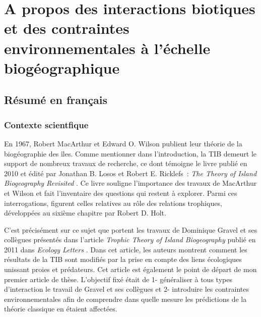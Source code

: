 \chapter{A propos des interactions biotiques et des contraintes environnementales à l'échelle biogéographique}
\label{chap1}

\section{Résumé en français}
%
\subsection{Contexte scientfique}

En 1967, Robert MacArthur et Edward O. Wilson publient leur théorie de la
biogéographie des îles.
Comme mentionner dans l'introduction, la TIB demeurt le support de nombreux travaux de recherche,
ce dont témoigne le livre publié en 2010 et édité par Jonathan B. Losos et Robert E. Ricklefs~: \emph{The Theory of Island Biogeography Revisited} \citep{Losos2010}.
Ce livre souligne l'importance des travaux de MacArthur et Wilson et fait l'inventaire des questions qui restent à explorer.
Parmi ces interrogations, figurent celles relatives au rôle des relations trophiques, développées au sixième chapitre par Robert D. Holt.

C'est précisément sur ce sujet que portent les travaux de Dominique Gravel et ses collègues présentés dans l'article \emph{Trophic Theory of Island Biogeography} publié en 2011 dans \emph{Ecology Letters} \citep{Gravel2011}.
Dans cet article, les auteurs montrent comment les résultats de la TIB sont modifiés par la prise en compte des liens écologiques unissant proies et prédateurs.
Cet article est également le point de départ de mon premier article de thèse. L'objectif fixé était de 1- généraliser à tous types d'interaction le travail de Gravel et ses collègues
et 2- introduire les contraintes environnementales afin de comprendre dans quelle mesure les prédictions de la théorie classique en étaient affectées.

